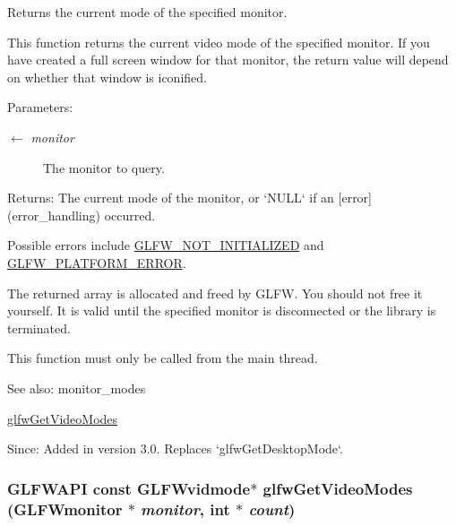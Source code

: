 Returns the current mode of the specified monitor. 

This function returns the current video mode of the specified monitor. If you have created a full screen window for that monitor, the return value will depend on whether that window is iconified.

\begin{Desc}
\item[Parameters:]
\begin{description}
\item[\mbox{$\leftarrow$} {\em monitor}]The monitor to query. \end{description}
\end{Desc}
\begin{Desc}
\item[Returns:]The current mode of the monitor, or `NULL` if an \mbox{[}error\mbox{]}(error\_\-handling) occurred.\end{Desc}
Possible errors include \hyperlink{group__errors_g2374ee02c177f12e1fa76ff3ed15e14a}{GLFW\_\-NOT\_\-INITIALIZED} and \hyperlink{group__errors_gd44162d78100ea5e87cdd38426b8c7a1}{GLFW\_\-PLATFORM\_\-ERROR}.

The returned array is allocated and freed by GLFW. You should not free it yourself. It is valid until the specified monitor is disconnected or the library is terminated.

This function must only be called from the main thread.

\begin{Desc}
\item[See also:]monitor\_\-modes 

\hyperlink{group__monitor_g811c28d61595e630774389985947c665}{glfwGetVideoModes}\end{Desc}
\begin{Desc}
\item[Since:]Added in version 3.0. Replaces `glfwGetDesktopMode`. \end{Desc}
\hypertarget{group__monitor_g811c28d61595e630774389985947c665}{
\subsubsection[glfwGetVideoModes]{\setlength{\rightskip}{0pt plus 5cm}GLFWAPI const {\bf GLFWvidmode}$\ast$ glfwGetVideoModes ({\bf GLFWmonitor} $\ast$ {\em monitor}, \/  int $\ast$ {\em count})}}
\label{group__monitor_g811c28d61595e630774389985947c665}



